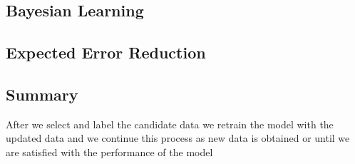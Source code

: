 \subsection{Bayesian Learning}

\subsection{Expected Error Reduction}

\subsection{Summary}

After we select and label the candidate data we retrain the model with the updated data and we continue this process as new data is obtained or until we are satisfied with the performance of the model



